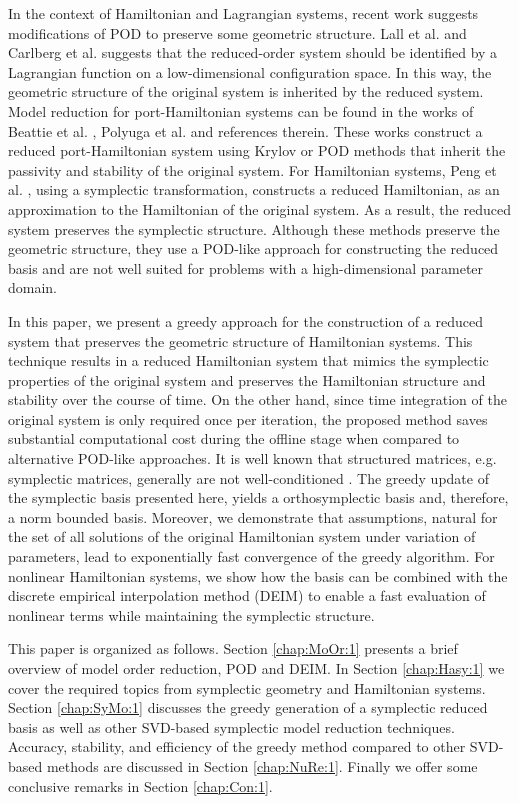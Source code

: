 In the context of Hamiltonian and Lagrangian systems, recent work suggests modifications of POD to preserve {\edit some} geometric structure. Lall et al. \cite{Lall:2003iy} and Carlberg et al. \cite{Carlberg:2014ky} suggests that the reduced-order system should be identified by a Lagrangian function on a low-dimensional configuration space. In this way, the geometric structure of the original system is inherited by the reduced system. {\edit Model reduction for port-Hamiltonian systems can be found in the works of Beattie et al. \cite{Chaturantabut:2016he}, Polyuga et al. \cite{Polyuga:2010gj} and references therein. These works construct a reduced port-Hamiltonian system using Krylov or POD methods that inherit the passivity and stability of the original system.} For Hamiltonian systems, Peng et al. \cite{Peng:2014di}, using a symplectic transformation, constructs a reduced Hamiltonian, as an approximation to the Hamiltonian of the original system. As a result, the reduced system preserves the symplectic structure. Although these methods preserve {\edit the} geometric structure, they use a POD-like approach for constructing the reduced basis and are not well {\edit suited} for problems with a high-dimensional parameter domain.

In this paper, we present a greedy approach for the construction of a reduced system that preserves the geometric structure of Hamiltonian systems. This technique results in a reduced Hamiltonian system that mimics the symplectic properties of the original system and preserves the Hamiltonian structure and stability over the course of time. On the other hand, since time integration of the original system is only required once per iteration, the proposed method saves substantial computational cost during the offline stage when compared to alternative POD-like approaches. {\edit It is well known that structured matrices, e.g. symplectic matrices, generally are not well-conditioned \cite{Karow:2006cf}. The greedy update of the symplectic basis presented here, yields a orthosymplectic basis and, therefore, a norm bounded basis.} Moreover, we demonstrate that assumptions, natural for the set of all solutions of the original Hamiltonian system under variation of parameters, lead to exponentially fast convergence of the greedy algorithm. For nonlinear Hamiltonian systems, we show how the basis can be combined with the discrete empirical interpolation method (DEIM) {\edit \cite{Chaturantabut:2010cz,Barrault:2004kz}} to enable a fast evaluation of nonlinear terms while maintaining the symplectic structure.

This paper is organized as follows. Section \ref{chap:MoOr:1} presents a brief overview of model order reduction, POD and DEIM. In Section \ref{chap:Hasy:1} we cover the required topics from symplectic geometry and Hamiltonian systems. Section \ref{chap:SyMo:1} discusses the greedy generation of a symplectic reduced basis as well as other SVD-based symplectic model reduction techniques. Accuracy, stability, and efficiency of the greedy method compared to other SVD-based methods are discussed in Section \ref{chap:NuRe:1}. {\edit Finally we offer some conclusive remarks in Section \ref{chap:Con:1}}.
